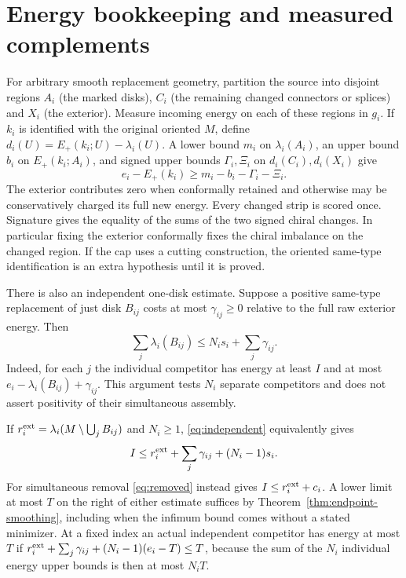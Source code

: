 \documentclass[11pt,letterpaper]{article}
\numberwithin{equation}{section}
\theoremstyle{remark}
\begin{document}




\section{Energy bookkeeping and measured complements}

For arbitrary smooth replacement geometry, partition the source
into disjoint regions \(A_i\) (the marked disks), \(C_i\) (the
remaining changed connectors or splices) and \(X_i\) (the
exterior). Measure incoming energy on each of these regions in
\(g_i\). If \(k_i\) is identified with the original oriented \(M\),
define \(d_i(U)=E_+(k_i;U)-\lambda_i(U)\). A lower bound \(m_i\) on
\(\lambda_i(A_i)\), an upper bound \(b_i\) on \(E_+(k_i;A_i)\), and
signed upper bounds \(\Gamma_i,\Xi_i\) on \(d_i(C_i),d_i(X_i)\)
give
\[
 e_i-E_+(k_i)\ge m_i-b_i-\Gamma_i-\Xi_i .
\]
The exterior contributes zero when conformally retained and otherwise
may be conservatively charged its full new energy. Every changed
strip is scored once. Signature gives the equality of the sums of
the two signed chiral changes. In particular fixing the exterior
conformally fixes the chiral imbalance on the changed region.
If the cap uses a cutting construction, the oriented same-type
identification is an extra hypothesis until it is proved.

There is also an independent one-disk estimate. Suppose a
positive same-type replacement of just disk \(B_{ij}\) costs
at most \(\gamma_{ij}\ge0\) relative to the full raw exterior
energy. Then
\begin{equation}\label{eq:independent}
 \sum_j\lambda_i(B_{ij})\le N_i s_i+\sum_j\gamma_{ij}.
\end{equation}
Indeed, for each \(j\) the individual competitor has energy at
least \(I\) and at most \(e_i-\lambda_i(B_{ij})+\gamma_{ij}\).
This argument tests \(N_i\) separate competitors and does not
assert positivity of their simultaneous assembly.

If \(r_i^{\rm ext}=\lambda_i(M\setminus\bigcup_j B_{ij})\)
and \(N_i\ge1\), \eqref{eq:independent} equivalently gives
\begin{equation}\label{eq:residual-test}
 I\le r_i^{\rm ext}+\sum_j\gamma_{ij}+(N_i-1)s_i .
\end{equation}
For simultaneous removal \eqref{eq:removed} instead gives
\(I\le r_i^{\rm ext}+c_i\). A lower limit at most \(T\) on the
right of either estimate suffices by Theorem~\ref{thm:endpoint-smoothing},
including when the infimum bound comes without a stated minimizer.
At a fixed index an actual
independent competitor has energy at most \(T\) if
\(r_i^{\rm ext}+\sum_j\gamma_{ij}+(N_i-1)(e_i-T)\le T\), because
the sum of the \(N_i\) individual energy upper bounds is then
at most \(N_i T\).
\end{document}
